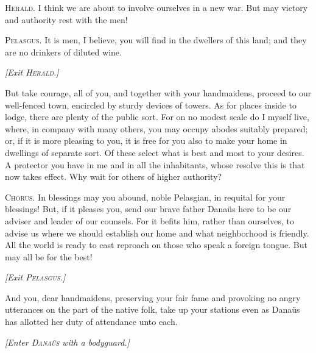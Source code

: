 \documentclass[12pt]{article}
\begin{document}
\textsc{Herald.} I think we are about to involve ourselves in a new war. But may victory and authority rest with the men!

\textsc{Pelasgus.} It is men, I believe, you will find in the dwellers of this land; and they are no drinkers of diluted wine.

\begin{center}
\textit{[Exit \textsc{Herald.}]}
\end{center}

But take courage, all of you, and together with your handmaidens, proceed to our well-fenced town, encircled by sturdy devices of towers. As for places inside to lodge, there are plenty of the public sort. For on no modest scale do I myself live, where, in company with many others, you may occupy abodes suitably prepared; or, if it is more pleasing to you, it is free for you also to make your home in dwellings of separate sort. Of these select what is best and most to your desires. A protector you have in me and in all the inhabitants, whose resolve this is that now takes effect. Why wait for others of higher authority?

\textsc{Chorus.} In blessings may you abound, noble Pelasgian, in requital for your blessings! But, if it pleases you, send our brave father Dana\"{u}s here to be our adviser and leader of our counsels. For it befits him, rather than ourselves, to advise us where we should establish our home and what neighborhood is friendly. All the world is ready to cast reproach on those who speak a foreign tongue. But may all be for the best!

\begin{center}
\textit{[Exit \textsc{Pelasgus.}]}
\end{center}

And you, dear handmaidens, preserving your fair fame and provoking no angry utterances on the part of the native folk, take up your stations even as Dana\"{u}s has allotted her duty of attendance unto each.

\begin{center}
\textit{[Enter \textsc{Dana\"{u}s} with a bodyguard.]}
\end{center}
\end{document}
